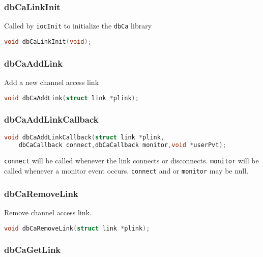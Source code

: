 \subsubsection{dbCaLinkInit}

Called by \verb|iocInit| to initialize the \verb|dbCa| library

\begin{lstlisting}[language=C]
void dbCaLinkInit(void);
\end{lstlisting}

\subsubsection{dbCaAddLink}

Add a new channel access link

\begin{lstlisting}[language=C]
void dbCaAddLink(struct link *plink);
\end{lstlisting}

\subsubsection{dbCaAddLinkCallback}

\begin{lstlisting}[language=C]
void dbCaAddLinkCallback(struct link *plink,
    dbCaCallback connect,dbCaCallback monitor,void *userPvt);
\end{lstlisting}

\verb|connect| will be called whenever the link connects or disconnects.
\verb|monitor| will be called whenever a monitor event occurs.
\verb|connect| and or \verb|monitor| may be null.

\subsubsection{dbCaRemoveLink}

Remove channel access link.

\begin{lstlisting}[language=C]
void dbCaRemoveLink(struct link *plink);
\end{lstlisting}

\subsubsection{dbCaGetLink}

